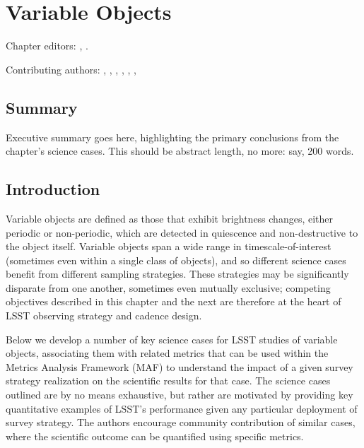 
\chapter[Variable Objects]{Variable Objects}
\def\chpname{variables}\label{chp:\chpname}

Chapter editors:
,
.

Contributing authors:
,
,
,
,
,
,

\section*{Summary}

Executive summary goes here, highlighting the primary conclusions from
the chapter's science cases. This should be abstract length, no more:
say, 200 words.



\section{Introduction}

Variable objects are defined as those that exhibit brightness changes,
either periodic or non-periodic, which are detected in quiescence and
non-destructive to the object itself. Variable objects span a wide range
in timescale-of-interest (sometimes even within a single class of
objects), and so different science cases benefit from different sampling
strategies. These strategies may be significantly disparate from one
another, sometimes even mutually exclusive; competing objectives
described in this chapter and the next are therefore at the heart of
LSST observing strategy and cadence design.

Below we develop a number of key science cases for LSST studies of
variable objects, associating them with related metrics that can be used
within the Metrics Analysis Framework (MAF) to understand the impact of
a given survey strategy realization on the scientific results for that
case. The science cases outlined are by no means exhaustive, but rather
are motivated by providing key quantitative examples of LSST's
performance given any particular deployment of survey strategy. The
authors encourage community contribution of similar cases, where the
scientific outcome can be quantified using specific metrics.



